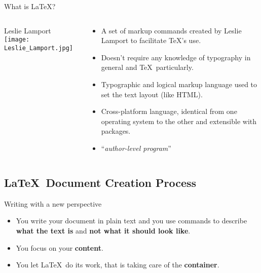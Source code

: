 \begin{frame}{What is \LaTeX?}
	\begin{columns}
		\begin{HEClegende}{Leslie Lamport}
			\texttt{[image: Leslie\_Lamport.jpg]}
		\end{HEClegende}
		\begin{HECcontenuLegende}
			\begin{itemize}
				\item A set of markup commands created by Leslie Lamport to facilitate \TeX's use.
				\item Doesn't require any knowledge of typography in general and \TeX\ particularly.
				\item Typographic and logical markup language used to set the text layout (like HTML).
				\item Cross-platform language, identical from one operating system to the other and extensible with packages.
				\item ``\emph{author-level program}''
			\end{itemize}
		\end{HECcontenuLegende}
	\end{columns}
\end{frame}

\subsection{\LaTeX\ Document Creation Process}

\begin{frame}[c]{Writing with a new perspective}
	
	\begin{itemize}
		\item You write your document in plain text and you use commands to describe 
			\textbf{what the text is} and \textbf{not what it should look like}.
		\item You focus on your \textbf{content}.
		\item You let \LaTeX\ do its work, that is taking care of the \textbf{container}.
	\end{itemize}
	
\end{frame}

